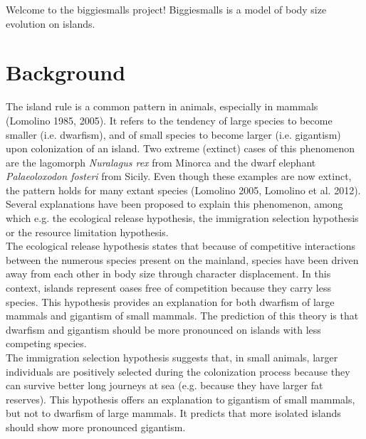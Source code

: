 \documentclass[12pt]{article}
\begin{document}
\maketitle

Welcome to the biggiesmalls project! Biggiesmalls is a model of body size evolution on islands.

\section{Background}

The island rule is a common pattern in animals, especially in mammals (Lomolino 1985, 2005). It refers to the tendency of large species to become smaller (i.e. dwarfism), and of small species to become larger (i.e. gigantism) upon colonization of an island. Two extreme (extinct) cases of this phenomenon are the lagomorph \textit{Nuralagus rex} from Minorca and the dwarf elephant \textit{Palaeoloxodon fosteri} from Sicily. Even though these examples are now extinct, the pattern holds for many extant species (Lomolino 2005, Lomolino et al. 2012).\\

Several explanations have been proposed to explain this phenomenon, among which e.g. the ecological release hypothesis, the immigration selection hypothesis or the resource limitation hypothesis.\\

The ecological release hypothesis states that because of competitive interactions between the numerous species present on the mainland, species have been driven away from each other in body size through character displacement. In this context, islands represent oases free of competition because they carry less species. This hypothesis provides an explanation for both dwarfism of large mammals and gigantism of small mammals. The prediction of this theory is that dwarfism and gigantism should be more pronounced on islands with less competing species.\\

The immigration selection hypothesis suggests that, in small animals, larger individuals are positively selected during the colonization process because they can survive better long journeys at sea (e.g. because they have larger fat reserves). This hypothesis offers an explanation to gigantism of small mammals, but not to dwarfism of large mammals. It predicts that more isolated islands should show more pronounced gigantism.\\
\end{document}
